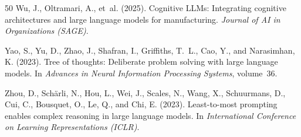 \documentclass[12pt,a4paper]{article}
\begin{document}
\begin{thebibliography}{50}
Wu, J., Oltramari, A., et~al. (2025).
\newblock Cognitive {LLMs}: Integrating cognitive architectures and large language models for manufacturing.
\newblock \emph{Journal of AI in Organizations (SAGE)}.

Yao, S., Yu, D., Zhao, J., Shafran, I., Griffiths, T.~L., Cao, Y., and Narasimhan, K. (2023).
\newblock Tree of thoughts: Deliberate problem solving with large language models.
\newblock In \emph{Advances in Neural Information Processing Systems}, volume~36.

Zhou, D., Sch{\"a}rli, N., Hou, L., Wei, J., Scales, N., Wang, X., Schuurmans, D., Cui, C., Bousquet, O., Le, Q., and Chi, E. (2023).
\newblock Least-to-most prompting enables complex reasoning in large language models.
\newblock In \emph{International Conference on Learning Representations (ICLR)}.

\end{thebibliography}
\end{document}
